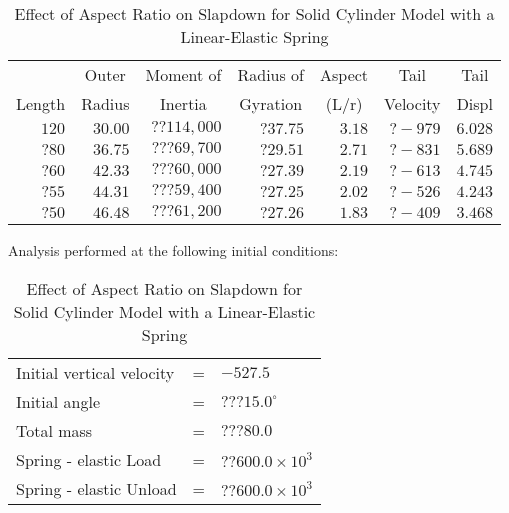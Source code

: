 \begin{table}
\begin{center}
\caption{Effect of Aspect Ratio on Slapdown for Solid Cylinder Model
with a Linear-Elastic Spring}
\makeqnum
\begin{tabular}{||r|r|r|r|r|r|r||}
\hline
&\multicolumn{1}{c|}{Outer}
&\multicolumn{1}{c|}{Moment of}
&\multicolumn{1}{c|}{Radius of}
&\multicolumn{1}{c|}{Aspect}
&\multicolumn{1}{c|}{Tail}
&\multicolumn{1}{c||}{Tail}\\
\multicolumn{1}{||c|}{Length}
&\multicolumn{1}{c|}{Radius}
&\multicolumn{1}{c|}{Inertia}
&\multicolumn{1}{c|}{Gyration}
&\multicolumn{1}{c|}{(L/r)}
&\multicolumn{1}{c|}{Velocity}
&\multicolumn{1}{c||}{Displ}\\
\hline
 $120$ &$30.00$ &$??114,000$ &$?37.75$ &$3.18$ &$?-979$ &$6.028$\\
 $?80$ &$36.75$ &$???69,700$ &$?29.51$ &$2.71$ &$?-831$ &$5.689$\\
 $?60$ &$42.33$ &$???60,000$ &$?27.39$ &$2.19$ &$?-613$ &$4.745$\\
 $?55$ &$44.31$ &$???59,400$ &$?27.25$ &$2.02$ &$?-526$ &$4.243$\\
 $?50$ &$46.48$ &$???61,200$ &$?27.26$ &$1.83$ &$?-409$ &$3.468$\\
\hline
\end{tabular}
\end{center}

Analysis performed at the following initial conditions:

\makeqnum
\begin{tabular}{lll}
Initial vertical velocity &= &$-527.5$\\
Initial angle             &= &$???15.0^\circ$\\
Total mass                &= &$???80.0$\\
Spring - elastic     Load &= &$??600.0\times10^3$\\
Spring - elastic   Unload &= &$??600.0\times10^3$\\
\end{tabular}
\end{table}

